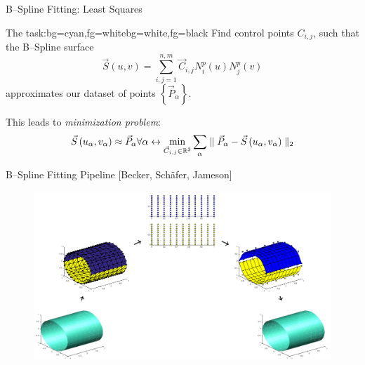 \begin{frame}{B--Spline Fitting: Least Squares}
\begin{variableblock}{The task:}{bg=cyan,fg=white}{bg=white,fg=black}
{
Find control points $C_{i,j}$, such that the B--Spline surface
\begin{equation*}
\vec{S}\left(u,v\right)=\sum\limits_{i,j=1}^{n,m} \vec{C}_{i,j} N_i^p\left(u\right) N_j^p\left(v\right)
\end{equation*}
approximates our dataset of points $\left\lbrace \vec{P}_{\alpha} \right\rbrace $. 
}
\end{variableblock}

This leads to \textit{minimization problem}:
\begin{equation*}
\vec{S}\left(u_\alpha,v_\alpha\right) \approx \vec{P}_{\alpha} \forall \alpha \leftrightarrow 
\underset{\vec{C}_{i,j}\in \mathbb{R}^3}{\min} \sum\limits_\alpha \norm{\vec{P}_{\alpha}-\vec{S}\left(u_\alpha,v_\alpha\right)}
\end{equation*}
\end{frame}
\begin{frame}{B--Spline Fitting Pipeline [Becker, Schäfer, Jameson]}
\begin{figure}
\includegraphics[scale=0.25]{Pictures/NURBS/TheArc.png}
\end{figure}
        
\end{frame}
